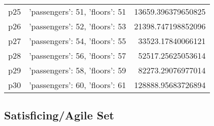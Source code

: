 \documentclass{article}
\begin{document}
\begin{center}
\begin{tabular}{r|r|r}
  p25&{'passengers': 51, 'floors': 51}&13659.396379650825\\
  p26&{'passengers': 52, 'floors': 53}&21398.747198852096\\
  p27&{'passengers': 54, 'floors': 55}&33523.17840066121\\
  p28&{'passengers': 56, 'floors': 57}&52517.25625053614\\
  p29&{'passengers': 58, 'floors': 59}&82273.29076977014\\
  p30&{'passengers': 60, 'floors': 61}&128888.95683726894
                            \end{tabular}
                            \end{center}
                    

                                \subsection*{Satisficing/Agile Set}
                                
\end{document}
